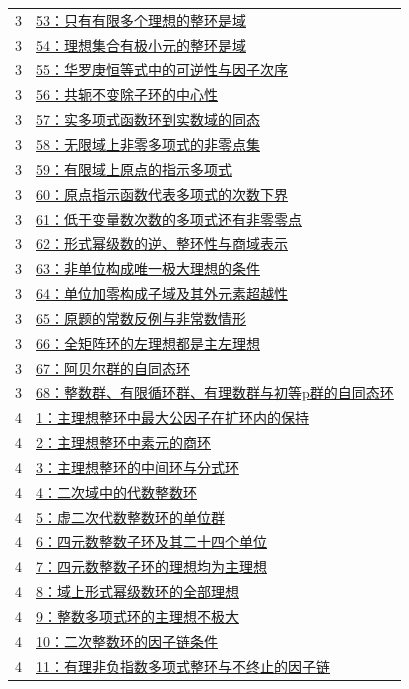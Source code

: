 \documentclass[UTF8,a4paper,11pt,fontset=windows]{ctexart}
\begin{document}
\begin{longtable}{cp{13.5cm}}
3 & \hyperref[ex:3:53]{53：只有有限多个理想的整环是域}\\
3 & \hyperref[ex:3:54]{54：理想集合有极小元的整环是域}\\
3 & \hyperref[ex:3:55]{55：华罗庚恒等式中的可逆性与因子次序}\\
3 & \hyperref[ex:3:56]{56：共轭不变除子环的中心性}\\
3 & \hyperref[ex:3:57]{57：实多项式函数环到实数域的同态}\\
3 & \hyperref[ex:3:58]{58：无限域上非零多项式的非零点集}\\
3 & \hyperref[ex:3:59]{59：有限域上原点的指示多项式}\\
3 & \hyperref[ex:3:60]{60：原点指示函数代表多项式的次数下界}\\
3 & \hyperref[ex:3:61]{61：低于变量数次数的多项式还有非零零点}\\
3 & \hyperref[ex:3:62]{62：形式幂级数的逆、整环性与商域表示}\\
3 & \hyperref[ex:3:63]{63：非单位构成唯一极大理想的条件}\\
3 & \hyperref[ex:3:64]{64：单位加零构成子域及其外元素超越性}\\
3 & \hyperref[ex:3:65]{65：原题的常数反例与非常数情形}\\
3 & \hyperref[ex:3:66]{66：全矩阵环的左理想都是主左理想}\\
3 & \hyperref[ex:3:67]{67：阿贝尔群的自同态环}\\
3 & \hyperref[ex:3:68]{68：整数群、有限循环群、有理数群与初等p群的自同态环}\\
4 & \hyperref[ex:4:1]{1：主理想整环中最大公因子在扩环内的保持}\\
4 & \hyperref[ex:4:2]{2：主理想整环中素元的商环}\\
4 & \hyperref[ex:4:3]{3：主理想整环的中间环与分式环}\\
4 & \hyperref[ex:4:4]{4：二次域中的代数整数环}\\
4 & \hyperref[ex:4:5]{5：虚二次代数整数环的单位群}\\
4 & \hyperref[ex:4:6]{6：四元数整数子环及其二十四个单位}\\
4 & \hyperref[ex:4:7]{7：四元数整数子环的理想均为主理想}\\
4 & \hyperref[ex:4:8]{8：域上形式幂级数环的全部理想}\\
4 & \hyperref[ex:4:9]{9：整数多项式环的主理想不极大}\\
4 & \hyperref[ex:4:10]{10：二次整数环的因子链条件}\\
4 & \hyperref[ex:4:11]{11：有理非负指数多项式整环与不终止的因子链}\\

\end{longtable}
\end{document}
